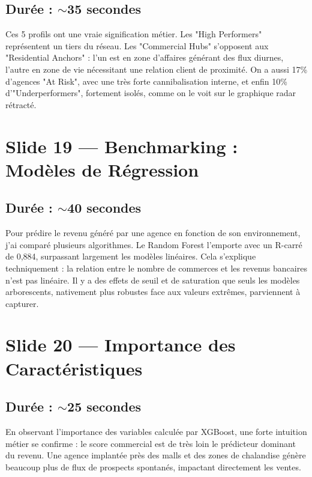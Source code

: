 \documentclass[11pt,a4paper]{article}
\begin{document}
\subsection{Durée : $\sim$35 secondes}
Ces 5 profils ont une vraie signification métier. Les "High Performers" représentent un tiers du réseau. Les "Commercial Hubs" s'opposent aux "Residential Anchors" : l'un est en zone d'affaires générant des flux diurnes, l'autre en zone de vie nécessitant une relation client de proximité. On a aussi 17\% d'agences "At Risk", avec une très forte cannibalisation interne, et enfin 10\% d'"Underperformers", fortement isolés, comme on le voit sur le graphique radar rétracté.

\section{Slide 19 --- Benchmarking : Modèles de Régression}
\subsection{Durée : $\sim$40 secondes}
Pour prédire le revenu généré par une agence en fonction de son environnement, j'ai comparé plusieurs algorithmes. Le Random Forest l'emporte avec un R-carré de 0,884, surpassant largement les modèles linéaires. Cela s'explique techniquement : la relation entre le nombre de commerces et les revenus bancaires n'est pas linéaire. Il y a des effets de seuil et de saturation que seuls les modèles arborescents, nativement plus robustes face aux valeurs extrêmes, parviennent à capturer.

\section{Slide 20 --- Importance des Caractéristiques}
\subsection{Durée : $\sim$25 secondes}
En observant l'importance des variables calculée par XGBoost, une forte intuition métier se confirme : le score commercial est de très loin le prédicteur dominant du revenu. Une agence implantée près des malls et des zones de chalandise génère beaucoup plus de flux de prospects spontanés, impactant directement les ventes.
\end{document}
